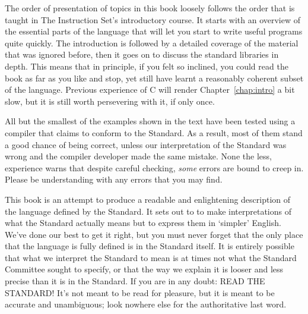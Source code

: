  
        

  

  The order of presentation of topics in this book loosely follows the
   order that is taught in The Instruction Set's introductory course. It
   starts with an overview of the essential parts of the language that will
   let you start to write useful programs quite quickly. The introduction is
   followed by a detailed coverage of the material that was ignored before,
   then it goes on to discuss the standard libraries in depth. This means that
   in principle, if you felt so inclined, you could read the book as far as
   you like and stop, yet still have learnt a reasonably coherent subset of
   the language. Previous experience of C will render Chapter~\ref{chap:intro}
   a bit slow, but it is still worth persevering with it, if only once.


 

  

  All but the smallest of the examples shown in the text have been tested
   using a compiler that claims to conform to the Standard. As a result, most
   of them stand a good chance of being correct, unless our interpretation of
   the Standard was wrong and the compiler developer made the same mistake.
   None the less, experience warns that despite careful checking,
   \textit{some} errors are bound to creep in. Please be understanding with
   any errors that you may find.


 

  

  This book is an attempt to produce a readable and enlightening
   description of the language defined by the Standard. It sets out to to make
   interpretations of what the Standard actually means but to express them in
   `simpler' English. We've done our best to get it right, but you must
   never forget that the only place that the language is fully defined is in
   the Standard itself. It is entirely possible that what we interpret the
   Standard to mean is at times not what the Standard Committee sought to
   specify, or that the way we explain it is looser and less precise than it
   is in the Standard. If you are in any doubt: READ THE STANDARD! It's not
   meant to be read for pleasure, but it is meant to be accurate and
   unambiguous; look nowhere else for the authoritative last word.


